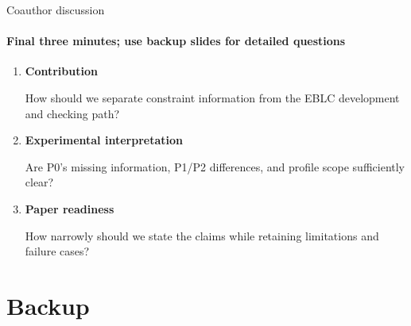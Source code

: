 \documentclass[aspectratio=169,11pt]{beamer}
\begin{document}

\begin{frame}{Coauthor discussion}
  \framesubtitle{Final three minutes; use backup slides for detailed questions}
  \vspace{1.5mm}
  \begin{enumerate}\setlength{\itemsep}{5mm}
    \item \textbf{Contribution}\par
      How should we separate constraint information from the EBLC development and checking path?
    \item \textbf{Experimental interpretation}\par
      Are P0's missing information, P1/P2 differences, and profile scope sufficiently clear?
    \item \textbf{Paper readiness}\par
      How narrowly should we state the claims while retaining limitations and failure cases?
  \end{enumerate}
\end{frame}
\appendix

\section{Backup}
\end{document}
